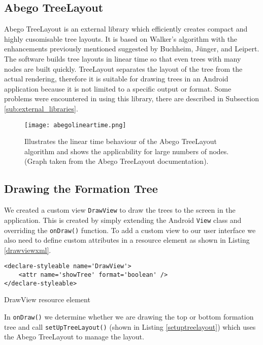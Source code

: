 \documentclass[draft]{report}
\begin{document}
\subsection{Abego TreeLayout}
\label{sub:abego_treelayout}

Abego TreeLayout is an external library which efficiently creates compact and highly cusomisable tree layouts. It is based on Walker's algorithm with the enhancements previously mentioned suggested by Buchheim, J\"unger, and Leipert\cite{treelayoutlineartime}. The software builds tree layouts in linear time so that even trees with many nodes are built quickly. TreeLayout separates the layout of the tree from the actual rendering, therefore it is suitable for drawing trees in an Android application because it is not limited to a specific output or format. Some problems were encountered in using this library, there are described in Subsection \ref{sub:external_libraries}.

\begin{figure}[ht]
    \centering
    \texttt{[image: abegolineartime.png]}
    \caption{Illustrates the linear time behaviour of the Abego TreeLayout algorithm\cite{abegolineartime} and shows the applicability for large numbers of nodes. (Graph taken from the Abego TreeLayout documentation).}
    \label{abegolineartime}
\end{figure}

\subsection{Drawing the Formation Tree}

We created a custom view {\tt DrawView} to draw the trees to the screen in the application. This is created by simply extending the Android {\tt View} class and overriding the {\tt onDraw()} function. To add a custom view to our user interface we also need to define custom attributes in a resource element as shown in Listing \ref{drawviewxml}.

\begin{listing}[ht!]
\begin{verbatim}
<declare-styleable name='DrawView'>
    <attr name='showTree' format='boolean' />
</declare-styleable>
\end{verbatim}
\caption{DrawView resource element}
\label{drawviewxml}
\end{listing}

In {\tt onDraw()} we determine whether we are drawing the top or bottom formation tree and call {\tt setUpTreeLayout()} (shown in Listing \ref{setuptreelayout}) which uses the Abego TreeLayout to manage the layout.
\end{document}

